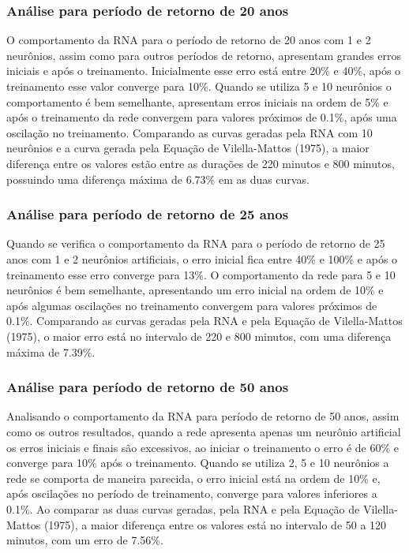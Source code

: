 \subsubsection{Análise para período de retorno de 20 anos}
O comportamento da RNA para o período de retorno de 20 anos com 1 e 2 neurônios, assim como para outros períodos de retorno, apresentam grandes erros iniciais e após o treinamento. Inicialmente esse erro está entre 20\% e 40\%, após o treinamento esse valor converge para 10\%. Quando se utiliza 5 e 10 neurônios o comportamento é bem semelhante, apresentam erros iniciais na ordem de 5\% e após o treinamento da rede convergem para valores próximos de 0.1\%, após uma oscilação no treinamento. Comparando as curvas geradas pela RNA com 10 neurônios e a curva gerada pela Equação de Vilella-Mattos (1975), a maior diferença entre os valores estão entre as durações de 220 minutos e 800 minutos, possuindo uma diferença máxima de 6.73\% em as duas curvas.

\subsubsection{Análise para período de retorno de 25 anos}
Quando se verifica o comportamento da RNA para o período de retorno de 25 anos com 1 e 2 neurônios artificiais, o erro inicial fica entre 40\% e 100\% e após o treinamento esse erro converge para 13\%. O comportamento da rede para 5 e 10 neurônios é bem semelhante, apresentando um erro inicial na ordem de 10\% e após algumas oscilações no treinamento convergem para valores próximos de 0.1\%. Comparando as curvas geradas pela RNA e pela Equação de Vilella-Mattos (1975), o maior erro está no intervalo de 220 e 800 minutos, com uma diferença máxima de 7.39\%.

\subsubsection{Análise para período de retorno de 50 anos}
Analisando o comportamento da RNA para período de retorno de 50 anos, assim como os outros resultados, quando a rede apresenta apenas um neurônio artificial os erros iniciais e finais são excessivos, ao iniciar o treinamento o erro é de 60\% e converge para 10\% após o treinamento. Quando se utiliza 2, 5 e 10 neurônios a rede se comporta de maneira parecida, o erro inicial está na ordem de 10\% e, após oscilações no período de treinamento, converge para valores inferiores a 0.1\%.  Ao comparar as duas curvas geradas, pela RNA e pela Equação de Vilella-Mattos (1975), a maior diferença entre os valores está no intervalo de 50 a 120 minutos, com um erro de 7.56\%.

